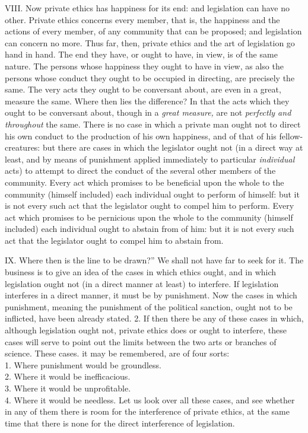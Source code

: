 \documentclass[12pt]{report}
\begin{document}
VIII. Now private ethics has happiness for its end: and legislation can
have no other. Private ethics concerns every member, that is, the
happiness and the actions of every member, of any community that can be
proposed; and legislation can concern no more. Thus far, then, private
ethics and the art of legislation go hand in hand. The end they have, or
ought to have, in view, is of the same nature. The persons whose
happiness they ought to have in view, as also the persons whose conduct
they ought to be occupied in directing, are precisely the same. The very
acts they ought to be conversant about, are even in a great, measure the
same. Where then lies the difference? In that the acts which they ought
to be conversant about, though in a \emph{great measure,} are not
\emph{perfectly and throughout} the same. There is no case in which a
private man ought not to direct his own conduct to the production of his
own happiness, and of that of his fellow-creatures: but there are cases
in which the legislator ought not (in a direct way at least, and by
means of punishment applied immediately to particular \emph{individual}
acts) to attempt to direct the conduct of the several other members of
the community. Every act which promises to be beneficial upon the whole
to the community (himself included) each individual ought to perform of
himself: but it is not every such act that the legislator ought to
compel him to perform. Every act which promises to be pernicious upon
the whole to the community (himself included) each individual ought to
abstain from of him: but it is not every such act that the legislator
ought to compel him to abstain from.

IX. Where then is the line to be drawn?'' We shall not have far
to seek for it. The business is to give an idea of the cases in which
ethics ought, and in which legislation ought not (in a direct manner at
least) to interfere. If legislation interferes in a direct manner, it
must be by punishment. Now the cases in which punishment, meaning the
punishment of the political sanction, ought not to be inflicted, have
been already stated. 2. If then there be any of these cases in which,
although legislation ought not, private ethics does or ought to
interfere, these cases will serve to point out the limits between the
two arts or branches of science. These cases. it may be remembered, are
of four sorts:\\
1. Where punishment would be groundless.\\
2. Where it would be inefficacious.\\
3. Where it would be unprofitable.\\
4. Where it would be needless. Let us look over all these cases, and see
whether in any of them there is room for the interference of private
ethics, at the same time that there is none for the direct interference
of legislation.
\end{document}
